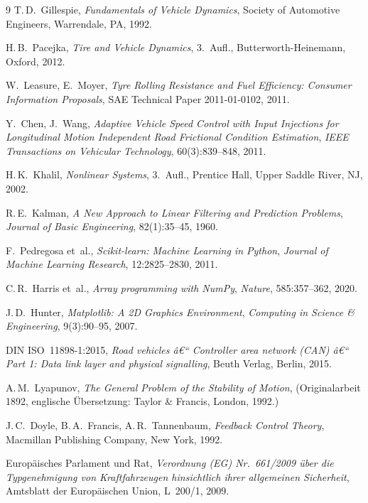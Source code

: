﻿\documentclass[a4paper,12pt]{article}
\theoremstyle{definition}
\begin{document}
\begin{thebibliography}{9}
T.\,D.~Gillespie,
\textit{Fundamentals of Vehicle Dynamics},
Society of Automotive Engineers, Warrendale, PA, 1992.

H.\,B.~Pacejka,
\textit{Tire and Vehicle Dynamics},
3.~Aufl., Butterworth-Heinemann, Oxford, 2012.

W.~Leasure, E.~Moyer,
\textit{Tyre Rolling Resistance and Fuel Efficiency: Consumer Information Proposals},
SAE Technical Paper 2011-01-0102, 2011.

Y.~Chen, J.~Wang,
\textit{Adaptive Vehicle Speed Control with Input Injections for Longitudinal Motion
Independent Road Frictional Condition Estimation},
\textit{IEEE Transactions on Vehicular Technology}, 60(3):839--848, 2011.

H.\,K.~Khalil,
\textit{Nonlinear Systems},
3.~Aufl., Prentice Hall, Upper Saddle River, NJ, 2002.

R.\,E.~Kalman,
\textit{A New Approach to Linear Filtering and Prediction Problems},
\textit{Journal of Basic Engineering}, 82(1):35--45, 1960.

F.~Pedregosa et~al.,
\textit{Scikit-learn: Machine Learning in Python},
\textit{Journal of Machine Learning Research}, 12:2825--2830, 2011.

C.\,R.~Harris et~al.,
\textit{Array programming with NumPy},
\textit{Nature}, 585:357--362, 2020.

J.\,D.~Hunter,
\textit{Matplotlib: A 2D Graphics Environment},
\textit{Computing in Science \& Engineering}, 9(3):90--95, 2007.

DIN ISO~11898-1:2015,
\textit{Road vehicles â€“ Controller area network (CAN) â€“ Part 1: Data link layer and physical signalling},
Beuth Verlag, Berlin, 2015.

A.\,M.~Lyapunov,
\textit{The General Problem of the Stability of Motion},
(Originalarbeit 1892, englische Übersetzung: Taylor \& Francis, London, 1992.)

J.\,C.~Doyle, B.\,A.~Francis, A.\,R.~Tannenbaum,
\textit{Feedback Control Theory},
Macmillan Publishing Company, New York, 1992.

Europäisches Parlament und Rat,
\textit{Verordnung (EG) Nr.~661/2009 über die Typgenehmigung von Kraftfahrzeugen
hinsichtlich ihrer allgemeinen Sicherheit},
Amtsblatt der Europäischen Union, L~200/1, 2009.


\end{thebibliography}
\end{document}
